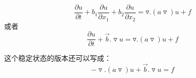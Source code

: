 \documentclass{article}
\begin{document}
$$\dfrac{\partial u}{\partial t}+b_1\dfrac{\partial u}{\partial x_1}+b_2\dfrac{\partial u}{\partial x_2}=\triangledown .(a\triangledown)u+f$$
或者
$$\dfrac{\partial u}{\partial t}+\vec b.\triangledown u=\triangledown .(a\triangledown)u+f$$

这个稳定状态的版本还可以写成：$$-\triangledown .(a\triangledown)u+\vec b.\triangledown u=f$$





 






















































\end{document}
